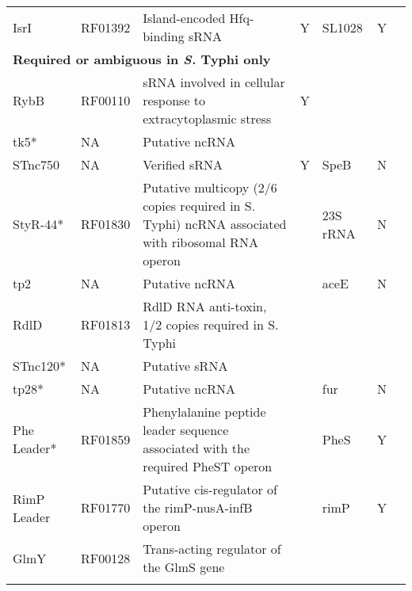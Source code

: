 \begin{longtable}{ l
    				p{0.3in}
				p{1.5in}
				c
				p{0.5in}
				p{0.5in}
				p{1in}
				}
    IsrI  & RF01392 & Island-encoded Hfq-binding sRNA & Y     & SL1028 & Y     &  \textcite{Sittka2008, Padalon-Brauch2008, Chao2012} \\
     \multicolumn{7}{l}{\textbf{Required or ambiguous in {\it S.} Typhi only}}\\
    RybB  & RF00110 & sRNA involved in cellular response to extracytoplasmic stress & Y     &       &       &  \textcite{Vogel2009} \\
    tk5*  & NA    & Putative ncRNA &       &       &       & \textcite{Raghavan2011,Rivas2001} \\
    STnc750 & NA    & Verified sRNA & Y     & SpeB  & N     & \textcite{Kroger2012, Chao2012} \\
    StyR-44* & RF01830 & Putative multicopy (2/6 copies required in S. Typhi) ncRNA associated with ribosomal RNA operon &       & 23S rRNA & N     &  \textcite{Chinni2010} \\
    tp2   & NA    & Putative ncRNA &       & aceE  & N     &  \textcite{Raghavan2011,Rivas2001} \\
    RdlD  & RF01813 & RdlD RNA anti-toxin, 1/2 copies required in S. Typhi &       &       &       & \textcite{Kawano2002} \\
    STnc120* & NA    & Putative sRNA &       &       &       & \textcite{Sittka2008} \\
    tp28* & NA    & Putative ncRNA &       & fur   & N     &  \textcite{Raghavan2011,Rivas2001} \\
    Phe Leader* & RF01859 & Phenylalanine peptide leader sequence associated with the required PheST operon &       & PheS  & Y     & \textcite{Zurawski1978} \\
    RimP Leader & RF01770 & Putative cis-regulator of the rimP-nusA-infB operon &       & rimP  & Y     & \textcite{Naville2010} \\
    GlmY  & RF00128 & Trans-acting regulator of the GlmS gene &       &       &       & \textcite{Urban2008} \\
    \bottomrule
    \label{tab:ncrna}%
    \end{longtable}%
\endgroup

